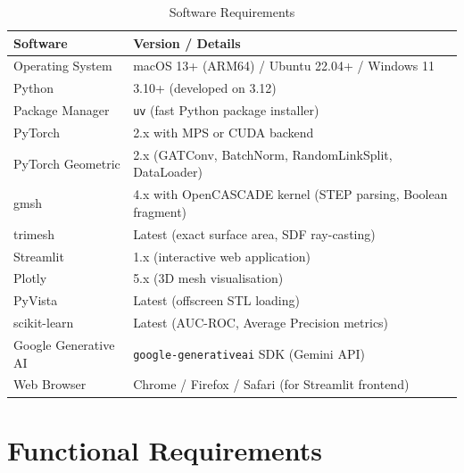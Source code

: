 \documentclass[12pt]{report}
\begin{document}
\begin{table}[H]
\centering
\caption{Software Requirements}
\begin{tabular}{p{4cm} p{8cm}}
\toprule
\textbf{Software} & \textbf{Version / Details} \\
\midrule
Operating System & macOS 13+ (ARM64) / Ubuntu 22.04+ / Windows 11 \\
Python & 3.10+ (developed on 3.12) \\
Package Manager & \texttt{uv} (fast Python package installer) \\
PyTorch & 2.x with MPS or CUDA backend \\
PyTorch Geometric & 2.x (GATConv, BatchNorm, RandomLinkSplit, DataLoader) \\
gmsh & 4.x with OpenCASCADE kernel (STEP parsing, Boolean fragment) \\
trimesh & Latest (exact surface area, SDF ray-casting) \\
Streamlit & 1.x (interactive web application) \\
Plotly & 5.x (3D mesh visualisation) \\
PyVista & Latest (offscreen STL loading) \\
scikit-learn & Latest (AUC-ROC, Average Precision metrics) \\
Google Generative AI & \texttt{google-generativeai} SDK (Gemini API) \\
Web Browser & Chrome / Firefox / Safari (for Streamlit frontend) \\
\bottomrule
\end{tabular}
\end{table}

\section{Functional Requirements}
\end{document}
